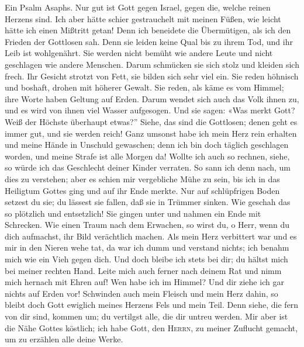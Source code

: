  Ein Psalm Asaphs. Nur gut ist Gott gegen Israel, gegen
die, welche reinen Herzens sind.  Ich aber hätte schier
gestrauchelt mit meinen Füßen, wie leicht hätte ich einen Mißtritt
getan!  Denn ich beneidete die Übermütigen, als ich den
Frieden der Gottlosen sah.  Denn sie leiden keine Qual bis
zu ihrem Tod, und ihr Leib ist wohlgenährt.  Sie werden
nicht bemüht wie andere Leute und nicht geschlagen wie andere Menschen.
 Darum schmücken sie sich stolz und kleiden sich frech.
 Ihr Gesicht strotzt von Fett, sie bilden sich sehr viel
ein.  Sie reden höhnisch und boshaft, drohen mit höherer
Gewalt.  Sie reden, als käme es vom Himmel; ihre Worte
haben Geltung auf Erden.  Darum wendet sich auch das Volk
ihnen zu, und es wird von ihnen viel Wasser aufgesogen. 
Und sie sagen: «Was merkt Gott? Weiß der Höchste überhaupt etwas?''
 Siehe, das sind die Gottlosen; denen geht es immer gut,
und sie werden reich!  Ganz umsonst habe ich mein Herz
rein erhalten und meine Hände in Unschuld gewaschen; 
denn ich bin doch täglich geschlagen worden, und meine Strafe ist alle
Morgen da!  Wollte ich auch so rechnen, siehe, so würde
ich das Geschlecht deiner Kinder verraten.  So sann ich
denn nach, um dies zu verstehen; aber es schien mir vergebliche Mühe zu
sein,  bis ich in das Heiligtum Gottes ging und auf ihr
Ende merkte.  Nur auf schlüpfrigen Boden setzest du sie;
du lässest sie fallen, daß sie in Trümmer sinken.  Wie
geschah das so plötzlich und entsetzlich! Sie gingen unter und nahmen
ein Ende mit Schrecken.  Wie einen Traum nach dem
Erwachen, so wirst du, o Herr, wenn du dich aufmachst, ihr Bild
verächtlich machen.  Als mein Herz verbittert war und es
mir in den Nieren wehe tat,  da war ich dumm und verstand
nichts; ich benahm mich wie ein Vieh gegen dich.  Und
doch bleibe ich stets bei dir; du hältst mich bei meiner rechten Hand.
 Leite mich auch ferner nach deinem Rat und nimm mich
hernach mit Ehren auf!  Wen habe ich im Himmel? Und dir
ziehe ich gar nichts auf Erden vor!  Schwinden auch mein
Fleisch und mein Herz dahin, so bleibt doch Gott ewiglich meines Herzens
Fels und mein Teil.  Denn siehe, die fern von dir sind,
kommen um; du vertilgst alle, die dir untreu werden.  Mir
aber ist die Nähe Gottes köstlich; ich habe Gott, den \textsc{Herrn}, zu
meiner Zuflucht gemacht, um zu erzählen alle deine Werke.


